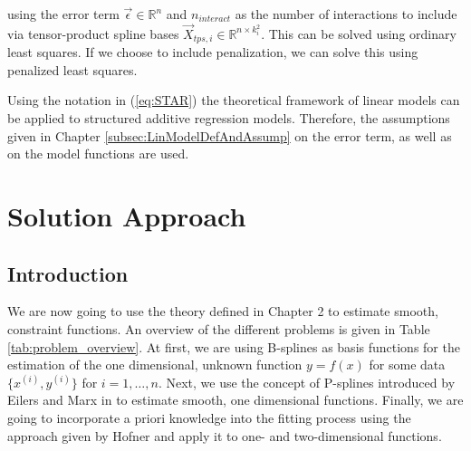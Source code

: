\documentclass[10pt,a4paper]{report}
\begin{document}
using the error term $\vec{\epsilon} \in \mathbb{R}^n$ and $n_{interact}$ as the number of interactions to include via tensor-product spline bases $\vec{X}_{tps,i} \in \mathbb{R}^{n \times k_i^2}$. This can be solved using ordinary least squares. If we choose to include penalization, we can solve this using penalized least squares. 

Using the notation in (\ref{eq:STAR}) the theoretical framework of linear models can be applied to structured additive regression models. Therefore, the assumptions given in Chapter \ref{subsec:LinModelDefAndAssump} on the error term, as well as on the model functions are used. \cite{fahrmeir2004penalized}






\chapter{Solution Approach}

\section{Introduction}

We are now going to use the theory defined in Chapter 2 to estimate smooth, constraint functions. An overview of the different problems is given in Table \ref{tab:problem_overview}. At first, we are using B-splines as basis functions for the estimation of the one dimensional, unknown function $y = f(x)$ for some data $\{x^{(i)}, y^{(i)}\}$ for $i = 1, \dots, n$.  Next, we use the concept of P-splines introduced by Eilers and Marx in \cite{eilers1996flexible} to estimate smooth, one dimensional functions. Finally, we are going to incorporate a priori knowledge into the fitting process using the approach given by Hofner and apply it to one- and two-dimensional functions. \cite{hofner2011monotonicity} 
\end{document}
